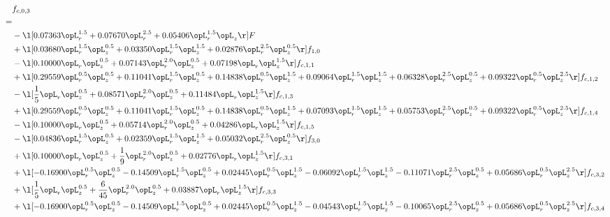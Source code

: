 \begin{alignat}{2} 
\label{eq:f_03_2} 
& f_{c,0,3} \nonumber \\ 
 = \\ 
& - \l[  0.07363 \opL_r^{1.5} +  0.07670 \opL_r^{2.5} +  0.05406 \opL_r^{1.5} \opL_z  \r] F \nonumber \\ 
& + \l[  0.03680 \opL_r^{1.5} \opL_z^{0.5} +  0.03350 \opL_r^{1.5} \opL_z^{1.5} +  0.02876 \opL_r^{2.5} \opL_z^{0.5}  \r] f_{1,0} \nonumber \\ 
& - \l[  0.10000 \opL_r \opL_z^{0.5} +  0.07143 \opL_r^{2.0} \opL_z^{0.5} +  0.07198 \opL_r \opL_z^{1.5}  \r] f_{c,1,1} \nonumber \\ 
& + \l[  0.29559 \opL_r^{0.5} \opL_z^{0.5} +  0.11041 \opL_r^{1.5} \opL_z^{0.5} +  0.14838 \opL_r^{0.5} \opL_z^{1.5} +  0.09064 \opL_r^{1.5} \opL_z^{1.5} +  0.06328 \opL_r^{2.5} \opL_z^{0.5} +  0.09322 \opL_r^{0.5} \opL_z^{2.5}  \r] f_{c,1,2} \nonumber \\ 
& - \l[ \frac{1}{5} \opL_r \opL_z^{0.5} +  0.08571 \opL_r^{2.0} \opL_z^{0.5} +  0.11484 \opL_r \opL_z^{1.5}  \r] f_{c,1,3} \nonumber \\ 
& + \l[  0.29559 \opL_r^{0.5} \opL_z^{0.5} +  0.11041 \opL_r^{1.5} \opL_z^{0.5} +  0.14838 \opL_r^{0.5} \opL_z^{1.5} +  0.07093 \opL_r^{1.5} \opL_z^{1.5} +  0.05753 \opL_r^{2.5} \opL_z^{0.5} +  0.09322 \opL_r^{0.5} \opL_z^{2.5}  \r] f_{c,1,4} \nonumber \\ 
& - \l[  0.10000 \opL_r \opL_z^{0.5} +  0.05714 \opL_r^{2.0} \opL_z^{0.5} +  0.04286 \opL_r \opL_z^{1.5}  \r] f_{c,1,5} \nonumber \\ 
& - \l[  0.04836 \opL_r^{1.5} \opL_z^{0.5} +  0.02359 \opL_r^{1.5} \opL_z^{1.5} +  0.05032 \opL_r^{2.5} \opL_z^{0.5}  \r] f_{3,0} \nonumber \\ 
& + \l[  0.10000 \opL_r \opL_z^{0.5} + \frac{1}{9} \opL_r^{2.0} \opL_z^{0.5} +  0.02776 \opL_r \opL_z^{1.5}  \r] f_{c,3,1} \nonumber \\ 
& + \l[  -0.16900 \opL_r^{0.5} \opL_z^{0.5}   -0.14509 \opL_r^{1.5} \opL_z^{0.5} +  0.02445 \opL_r^{0.5} \opL_z^{1.5}   -0.06092 \opL_r^{1.5} \opL_z^{1.5}   -0.11071 \opL_r^{2.5} \opL_z^{0.5} +  0.05686 \opL_r^{0.5} \opL_z^{2.5}  \r] f_{c,3,2} \nonumber \\ 
& + \l[ \frac{1}{5} \opL_r \opL_z^{0.5} + \frac{6}{45} \opL_r^{2.0} \opL_z^{0.5} +  0.03887 \opL_r \opL_z^{1.5}  \r] f_{c,3,3} \nonumber \\ 
& + \l[  -0.16900 \opL_r^{0.5} \opL_z^{0.5}   -0.14509 \opL_r^{1.5} \opL_z^{0.5} +  0.02445 \opL_r^{0.5} \opL_z^{1.5}   -0.04543 \opL_r^{1.5} \opL_z^{1.5}   -0.10065 \opL_r^{2.5} \opL_z^{0.5} +  0.05686 \opL_r^{0.5} \opL_z^{2.5}  \r] f_{c,3,4} \nonumber \\ 

\end{alignat}
